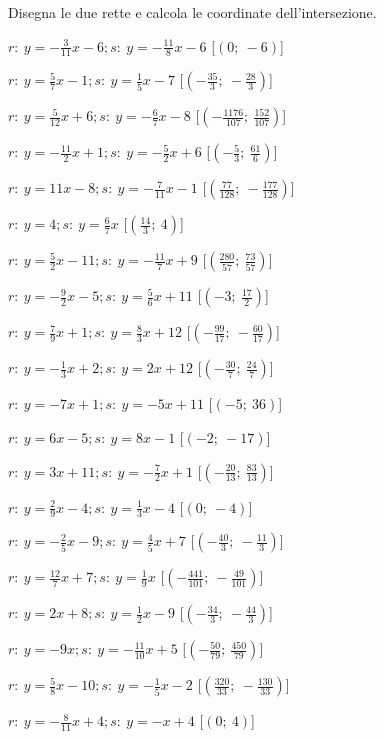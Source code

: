 \begin{esercizio}\label{ese:}
 Disegna le due rette e calcola le coordinate dell'intersezione.
 \begin{enumeratea}
  \item  $r:~y = -\frac{3}{11} x -6; s:~y = -\frac{11}{8} x -6$ \hfill 
   [$(0;~-6)$]
  \item  $r:~y = \frac{5}{7} x -1; s:~y = \frac{1}{5} x -7$ \hfill 
   [$(-\frac{35}{3};~-\frac{28}{3})$]
  \item  $r:~y = \frac{5}{12} x +6; s:~y = -\frac{6}{7} x -8$ \hfill 
   [$(-\frac{1176}{107};~\frac{152}{107})$]
  \item  $r:~y = -\frac{11}{2} x +1; s:~y = -\frac{5}{2} x +6$ \hfill 
   [$(-\frac{5}{3};~\frac{61}{6})$]
  \item  $r:~y = 11 x -8; s:~y = -\frac{7}{11} x -1$ \hfill 
   [$(\frac{77}{128};~-\frac{177}{128})$]
  \item  $r:~y = 4; s:~y = \frac{6}{7} x $ \hfill 
   [$(\frac{14}{3};~4)$]
  \item  $r:~y = \frac{5}{2} x -11; s:~y = -\frac{11}{7} x +9$ \hfill 
   [$(\frac{280}{57};~\frac{73}{57})$]
  \item  $r:~y = -\frac{9}{2} x -5; s:~y = \frac{5}{6} x +11$ \hfill 
   [$(-3;~\frac{17}{2})$]
  \item  $r:~y = \frac{7}{9} x +1; s:~y = \frac{8}{3} x +12$ \hfill 
   [$(-\frac{99}{17};~-\frac{60}{17})$]
  \item  $r:~y = -\frac{1}{3} x +2; s:~y = 2 x +12$ \hfill 
   [$(-\frac{30}{7};~\frac{24}{7})$]
  \item  $r:~y = -7 x +1; s:~y = -5 x +11$ \hfill 
   [$(-5;~36)$]
  \item  $r:~y = 6 x -5; s:~y = 8 x -1$ \hfill 
   [$(-2;~-17)$]
  \item  $r:~y = 3 x +11; s:~y = -\frac{7}{2} x +1$ \hfill 
   [$(-\frac{20}{13};~\frac{83}{13})$]
  \item  $r:~y = \frac{2}{9} x -4; s:~y = \frac{1}{3} x -4$ \hfill 
   [$(0;~-4)$]
  \item  $r:~y = -\frac{2}{5} x -9; s:~y = \frac{4}{5} x +7$ \hfill 
   [$(-\frac{40}{3};~-\frac{11}{3})$]
  \item  $r:~y = \frac{12}{7} x +7; s:~y = \frac{1}{9} x $ \hfill 
   [$(-\frac{441}{101};~-\frac{49}{101})$]
  \item  $r:~y = 2 x +8; s:~y = \frac{1}{2} x -9$ \hfill 
   [$(-\frac{34}{3};~-\frac{44}{3})$]
  \item  $r:~y = -9 x ; s:~y = -\frac{11}{10} x +5$ \hfill 
   [$(-\frac{50}{79};~\frac{450}{79})$]
  \item  $r:~y = \frac{5}{8} x -10; s:~y = -\frac{1}{5} x -2$ \hfill 
   [$(\frac{320}{33};~-\frac{130}{33})$]
  \item  $r:~y = -\frac{8}{11} x +4; s:~y = - x +4$ \hfill 
   [$(0;~4)$]
 \end{enumeratea}
\end{esercizio}

